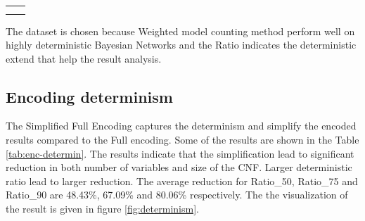 \begin{tabular}{c|c}
     &  \\
     & 
\end{tabular}
The dataset is chosen because Weighted model counting method perform well on highly deterministic Bayesian Networks and the Ratio indicates the deterministic extend that help the result analysis.
\subsection{Encoding determinism}
The Simplified Full Encoding captures the determinism and simplify the encoded results compared to the Full encoding. Some of the results are shown in the Table \ref{tab:enc-determin}. The results indicate that the simplification lead to significant reduction in both number of variables and size of the CNF. Larger deterministic ratio lead to larger reduction. The average reduction for Ratio\_50, Ratio\_75 and Ratio\_90 are 48.43\%, 67.09\% and 80.06\% respectively. The the visualization of the result is given in figure \ref{fig:determinism}.
